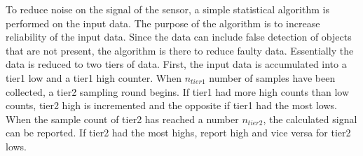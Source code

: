To reduce noise on the signal of the sensor, a simple statistical algorithm is
performed on the input data. The purpose of the algorithm is to increase reliability of the input data. Since the data can include false detection of objects that are not present, the algorithm is there to reduce  faulty data.  Essentially the data is reduced to two tiers
of data. First, the input data is accumulated into a tier1 low and a tier1 high
counter. When $n_{tier1}$ number of samples have been collected, a tier2 sampling round begins. If tier1
had more high counts than low counts, tier2 high is incremented and the opposite if
tier1 had the most lows. When the sample count of tier2 has reached a number
$n_{tier2}$, the calculated signal can be reported. If tier2 had the most highs,
report high and vice versa for tier2 lows.



